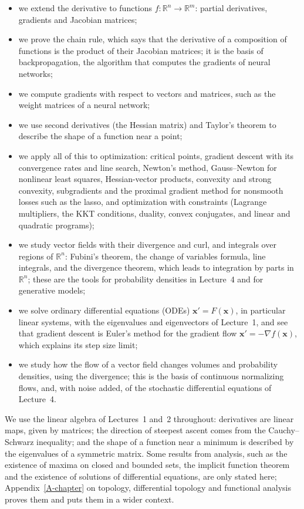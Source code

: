 \begin{itemize}
    \item we extend the derivative to functions $f: \mathbb{R}^n \to \mathbb{R}^m$: partial derivatives, gradients and Jacobian matrices;
    \item we prove the chain rule, which says that the derivative of a composition of functions is the product of their Jacobian matrices; it is the basis of backpropagation, the algorithm that computes the gradients of neural networks;
    \item we compute gradients with respect to vectors and matrices, such as the weight matrices of a neural network;
    \item we use second derivatives (the Hessian matrix) and Taylor's theorem to describe the shape of a function near a point;
    \item we apply all of this to optimization: critical points, gradient descent with its convergence rates and line search, Newton's method, Gauss--Newton for nonlinear least squares, Hessian-vector products, convexity and strong convexity, subgradients and the proximal gradient method for nonsmooth losses such as the lasso, and optimization with constraints (Lagrange multipliers, the KKT conditions, duality, convex conjugates, and linear and quadratic programs);
    \item we study vector fields with their divergence and curl, and integrals over regions of $\mathbb{R}^n$: Fubini's theorem, the change of variables formula, line integrals, and the divergence theorem, which leads to integration by parts in $\mathbb{R}^n$; these are the tools for probability densities in Lecture~4 and for generative models;
    \item we solve ordinary differential equations (ODEs) $\mathbf{x}' = F(\mathbf{x})$, in particular linear systems, with the eigenvalues and eigenvectors of Lecture~1, and see that gradient descent is Euler's method for the gradient flow $\mathbf{x}' = -\nabla f(\mathbf{x})$, which explains its step size limit;
    \item we study how the flow of a vector field changes volumes and probability densities, using the divergence; this is the basis of continuous normalizing flows, and, with noise added, of the stochastic differential equations of Lecture~4.
\end{itemize}
We use the linear algebra of Lectures~1 and~2 throughout: derivatives are linear maps, given by matrices; the direction of steepest ascent comes from the Cauchy--Schwarz inequality; and the shape of a function near a minimum is described by the eigenvalues of a symmetric matrix. Some results from analysis, such as the existence of maxima on closed and bounded sets, the implicit function theorem and the existence of solutions of differential equations, are only stated here; Appendix~\ref{A-chapter} on topology, differential topology and functional analysis proves them and puts them in a wider context.

